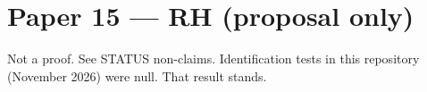 \documentclass[11pt]{article}
\begin{document}
\section*{Paper 15 — RH (proposal only)}
Not a proof. See STATUS non-claims.
Identification tests in this repository (November 2026) were null. That result stands.
\end{document}
